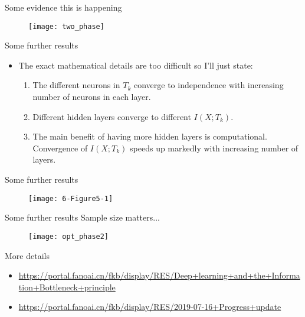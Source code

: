 \documentclass{beamer}
\begin{document}
\begin{frame}{Some evidence this is happening}
\begin{figure}
	\centering
	\texttt{[image: two\_phase]}
	\label{fig:twophase}
\end{figure}
\end{frame}

\begin{frame}{Some further results}
\begin{itemize}
	\item The exact mathematical details are too difficult so I'll just state: 
	\begin{enumerate}
		\item The different neurons in $T_k$ converge to independence with increasing number of neurons in each layer. 
		\item Different hidden layers converge to different  $I(X;T_k)$.
		\item The main benefit of having more hidden layers is computational. Convergence of $I(X;T_k)$ speeds up markedly with increasing number of layers.
	\end{enumerate}
\end{itemize}
\end{frame}

\begin{frame}{Some further results}
\begin{figure}
	\centering
	\texttt{[image: 6-Figure5-1]}
	\label{fig:6-figure5-1}
\end{figure}
\end{frame}

\begin{frame}{Some further results}
Sample size matters... 
\begin{figure}
	\centering
	\texttt{[image: opt\_phase2]}
	\label{opt_phase2}
\end{figure}
\end{frame}


\begin{frame}{More details}
\begin{itemize}
	\item \url{https://portal.fanoai.cn/fkb/display/RES/Deep+learning+and+the+Information+Bottleneck+principle} 
	\item \url{https://portal.fanoai.cn/fkb/display/RES/2019-07-16+Progress+update}
\end{itemize}
\end{frame}
\end{document}
